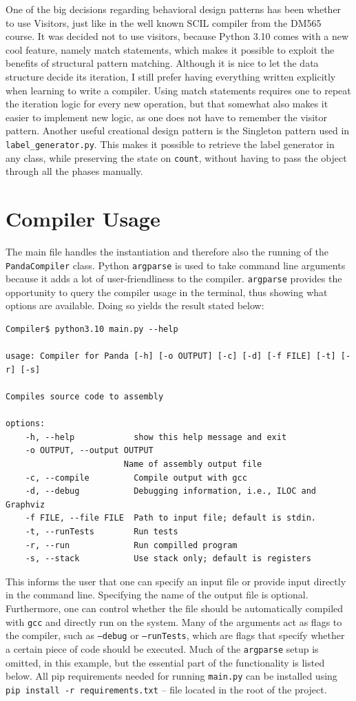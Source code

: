 One of the big decisions regarding behavioral design patterns has been whether to use Visitors, just like in the well known SCIL compiler from the DM565 course. It was decided not to use visitors, because Python 3.10 comes with a new cool feature, namely match statements, which makes it possible to exploit the benefits of structural pattern matching. Although it is nice to let the data structure decide its iteration, I still prefer having everything written explicitly when learning to write a compiler. Using match statements requires one to repeat the iteration logic for every new operation, but that somewhat also makes it easier to implement new logic, as one does not have to remember the visitor pattern. Another useful creational design pattern is the Singleton pattern used in \texttt{label\_generator.py}. This makes it possible to retrieve the label generator in any class, while preserving the state on \texttt{count}, without having to pass the object through all the phases manually.

\section{Compiler Usage}
The main file handles the instantiation and therefore also the running of the \texttt{PandaCompiler} class. Python \texttt{argparse} is used to take command line arguments because it adds a lot of user-friendliness to the compiler. \texttt{argparse} provides the opportunity to query the compiler usage in the terminal, thus showing what options are available. Doing so yields the result stated below:

\begin{verbatim}
Compiler$ python3.10 main.py --help

usage: Compiler for Panda [-h] [-o OUTPUT] [-c] [-d] [-f FILE] [-t] [-r] [-s]

Compiles source code to assembly

options:
    -h, --help            show this help message and exit
    -o OUTPUT, --output OUTPUT
                        Name of assembly output file
    -c, --compile         Compile output with gcc
    -d, --debug           Debugging information, i.e., ILOC and Graphviz
    -f FILE, --file FILE  Path to input file; default is stdin.
    -t, --runTests        Run tests
    -r, --run             Run compilled program
    -s, --stack           Use stack only; default is registers
\end{verbatim}

This informs the user that one can specify an input file or provide input directly in the command line. Specifying the name of the output file is optional. Furthermore, one can control whether the file should be automatically compiled with \texttt{gcc} and directly run on the system. Many of the arguments act as flags to the compiler, such as \texttt{--debug} or \texttt{--runTests}, which are flags that specify whether a certain piece of code should be executed. Much of the \texttt{argparse} setup is omitted, in this example, but the essential part of the functionality is listed below. All pip requirements needed for running \texttt{main.py} can be installed using \texttt{pip install -r requirements.txt} -- file located in the root of the project.

